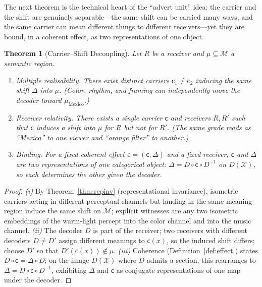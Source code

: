 \documentclass[twocolumn,11pt,a4paper]{article}
\theoremstyle{adv}
\newtheorem{theorem}{Theorem}[section]
\theoremstyle{definition}
\theoremstyle{remark}
\newcommand{\Out}{\mathcal{X}}         %
\newcommand{\Dec}{D}                   %
\newcommand{\Recv}{R}                  %
\newcommand{\Eff}{\varepsilon}        %
\newcommand{\Carrier}{\kappa}         %
\renewcommand{\Carrier}{\mathsf{c}}
\newcommand{\Mean}{\mathcal{M}}        %
\newcommand{\shift}{\Delta}            %
\begin{document}
The next theorem is the technical heart of the ``advert unit'' idea: the
carrier and the shift are genuinely separable---the same shift can be
carried many ways, and the same carrier can mean different things to
different receivers---yet they are bound, in a coherent effect, as two
representations of one object.

\begin{theorem}[Carrier--Shift Decoupling]
\label{thm:decoupling}
Let $\Recv$ be a receiver and $\mu\subseteq\Mean$ a semantic region.
\begin{enumerate}[label=(\roman*),leftmargin=1.8em,itemsep=2pt]
\item \emph{Multiple realisability.} There exist distinct carriers
  $\Carrier_1\ne\Carrier_2$ inducing the same shift $\shift$ into $\mu$.
  (Color, rhythm, and framing can independently move the decoder toward
  $\mu_{\text{Mexico}}$.)
\item \emph{Receiver relativity.} There exists a single carrier $\Carrier$
  and receivers $\Recv,\Recv'$ such that $\Carrier$ induces a shift into
  $\mu$ for $\Recv$ but not for $\Recv'$. (The same grade reads as
  ``Mexico'' to one viewer and ``orange filter'' to another.)
\item \emph{Binding.} For a fixed coherent effect $\Eff=(\Carrier,\shift)$
  and a fixed receiver, $\Carrier$ and $\shift$ are two representations of
  one categorical object: $\shift=\Dec\circ\Carrier\circ\Dec^{-1}$ on
  $\Dec(\Out)$, so each determines the other given the decoder.
\end{enumerate}
\end{theorem}

\begin{proof}
\emph{(i)} By Theorem~\ref{thm:repinv} (representational invariance),
isometric carriers acting in different perceptual channels but landing in
the same meaning-region induce the same shift on $\Mean$; explicit
witnesses are any two isometric embeddings of the warm-light percept into
the color channel and into the music channel. \emph{(ii)} The decoder
$\Dec$ is part of the receiver; two receivers with different decoders
$\Dec\ne\Dec'$ assign different meanings to $\Carrier(x)$, so the induced
shift differs; choose $\Dec'$ so that $\Dec'(\Carrier(x))\notin\mu$.
\emph{(iii)} Coherence (Definition~\ref{def:effect}) states
$\Dec\circ\Carrier=\shift\circ\Dec$; on the image $\Dec(\Out)$ where
$\Dec$ admits a section, this rearranges to
$\shift=\Dec\circ\Carrier\circ\Dec^{-1}$, exhibiting $\shift$ and
$\Carrier$ as conjugate representations of one map under the decoder.
\end{proof}
\end{document}
